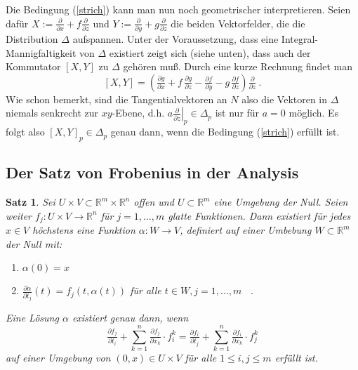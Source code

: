 \documentclass[12pt,a4paper]{article}
\def\R{\mathbb{R}}
\newtheorem{Satz}[Lemma]{Satz}
\begin{document}
\bigskip

Die Bedingung (\ref{strich}) kann man nun noch geometrischer interpretieren. Seien daf\"ur
$X:=\tfrac{\partial }{\partial x} + f \tfrac{\partial }{\partial z} $ und
$Y:=\tfrac{\partial }{\partial y} + g \tfrac{\partial }{\partial z} $ die beiden Vektorfelder, die
die Distribution $\Delta$ aufspannen. Unter der Voraussetzung, dass eine Integral-Mannigfaltigkeit
von $\Delta$ existiert zeigt sich  (siehe unten), dass auch der Kommutator $[X,Y]$ zu $\Delta$
geh\"oren mu\ss{}. Durch eine kurze Rechnung findet man
$$
[X, Y] = (\tfrac{\partial g}{\partial x} + f\,\tfrac{\partial g}{\partial z}
-
\tfrac{\partial f}{\partial y} - g\,\tfrac{\partial f}{\partial z}
)  \tfrac{\partial }{\partial z} \ .
$$
Wie schon bemerkt, sind die Tangentialvektoren an $N$ also die Vektoren in $\Delta$ niemals
senkrecht zur $xy$-Ebene, d.h. $a \left.\tfrac{\partial }{\partial z} \right|_p \in \Delta_p$ ist
nur f\"ur $a=0$ m\"oglich. Es folgt also $[X,Y]_p \in \Delta_p$ genau dann, wenn die
Bedingung (\ref{strich}) erf\"ullt ist.

\bigskip

\subsection{Der Satz von Frobenius in der Analysis}


\begin{Satz}
Sei $U \times V \subset \R^m \times \R^n$ offen und $U \subset \R^m$ eine Umgebung der Null. Seien
weiter $f_j: U \times V \rightarrow \R^n$ f\"ur $j=1,\ldots,m$ glatte Funktionen. Dann existiert
f\"ur jedes $x\in V$ h\"ochstens eine Funktion $\alpha : W\rightarrow V$, definiert auf einer Umbebung
$W \subset \R^m$ der Null mit:
\begin{enumerate}
\item
$\alpha(0) = x$
\item
$ \tfrac{\partial \alpha}{\partial t_j}(t) = f_j(t, \alpha(t)) $   f\"ur alle $t\in W, j=1,\ldots, m$ \ .
\end{enumerate}
Eine L\"osung $\alpha$ existiert genau dann, wenn
$$
\tfrac{\partial f_j}{\partial t_i} + \sum^n_{k=1} \tfrac{\partial f_j}{\partial x_k} \cdot f^k_i
=
\tfrac{\partial f_i}{\partial t_j} + \sum^n_{k=1} \tfrac{\partial f_i}{\partial x_k} \cdot f^k_j
$$
auf einer Umgebung von $(0,x) \in U \times V$ f\"ur alle $1\le i,j \le m$ erf\"ullt ist.
\end{Satz}

\bigskip
\end{document}
